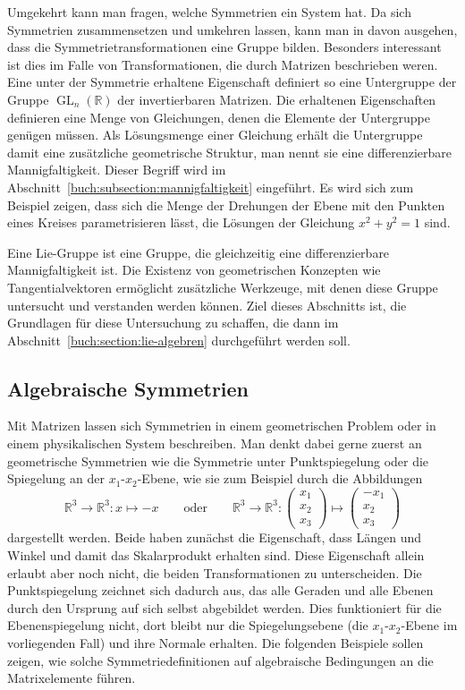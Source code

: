 Umgekehrt kann man fragen, welche Symmetrien ein System hat.
Da sich Symmetrien zusammensetzen und umkehren lassen, kann man in davon
ausgehen, dass die Symmetrietransformationen eine Gruppe bilden.
Besonders interessant ist dies im Falle von Transformationen, die
durch Matrizen beschrieben weren.
Eine unter der Symmetrie erhaltene Eigenschaft definiert so eine
Untergruppe der Gruppe $\operatorname{GL}_n(\mathbb{R})$ der
invertierbaren Matrizen.
Die erhaltenen Eigenschaften definieren eine Menge von Gleichungen,
denen die Elemente der Untergruppe genügen müssen.
Als Lösungsmenge einer Gleichung erhält die Untergruppe damit eine
zusätzliche geometrische Struktur, man nennt sie eine differenzierbare
Mannigfaltigkeit.
Dieser Begriff wird im Abschnitt~\ref{buch:subsection:mannigfaltigkeit}
eingeführt.
Es wird sich zum Beispiel zeigen, dass sich die Menge der Drehungen der
Ebene mit den Punkten eines Kreises parametrisieren lässt,
die Lösungen der Gleichung $x^2+y^2=1$ sind.

Eine Lie-Gruppe ist eine Gruppe, die gleichzeitig eine differenzierbare
Mannigfaltigkeit ist.
Die Existenz von geometrischen Konzepten wie Tangentialvektoren
ermöglicht zusätzliche Werkzeuge, mit denen diese Gruppe untersucht
und verstanden werden können.
Ziel dieses Abschnitts ist, die Grundlagen für diese Untersuchung zu
schaffen, die dann im Abschnitt~\ref{buch:section:lie-algebren}
durchgeführt werden soll.

\subsection{Algebraische Symmetrien
\label{buch:subsection:algebraische-symmetrien}}
Mit Matrizen lassen sich Symmetrien in einem geometrischen Problem
oder in einem physikalischen System beschreiben.
Man denkt dabei gerne zuerst an geometrische Symmetrien wie die
Symmetrie unter Punktspiegelung oder die Spiegelung an der $x_1$-$x_2$-Ebene,
wie sie zum Beispiel durch die Abbildungen
\[
\mathbb{R}^3\to\mathbb{R}^3 : x\mapsto -x
\qquad\text{oder}\qquad
\mathbb{R}^3\to\mathbb{R}^3 :
\begin{pmatrix}x_1\\x_2\\x_3\end{pmatrix}
\mapsto
\begin{pmatrix}-x_1\\x_2\\x_3\end{pmatrix}
\]
dargestellt werden.
Beide haben zunächst die Eigenschaft, dass Längen und Winkel und damit
das Skalarprodukt erhalten sind.
Diese Eigenschaft allein erlaubt aber noch nicht, die beiden Transformationen
zu unterscheiden.
Die Punktspiegelung zeichnet sich dadurch aus, das alle Geraden und alle
Ebenen durch den Ursprung auf sich selbst abgebildet werden.
Dies funktioniert für die Ebenenspiegelung nicht, dort bleibt nur die
Spiegelungsebene (die $x_1$-$x_2$-Ebene im vorliegenden Fall) und
ihre Normale erhalten.
Die folgenden Beispiele sollen zeigen, wie solche Symmetriedefinitionen
auf algebraische Bedingungen an die Matrixelemente führen.

